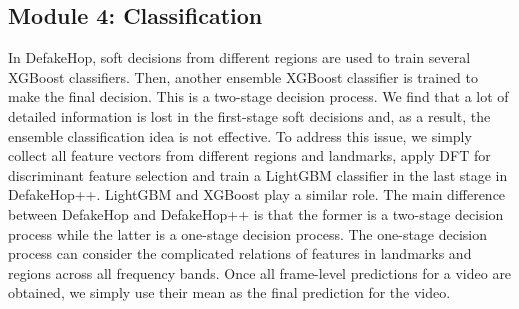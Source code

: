 \documentclass[main, biber]{now-journal}
\begin{document}
\subsection{Module 4: Classification}

In DefakeHop, soft decisions from different regions are used to train
several XGBoost classifiers. Then, another ensemble XGBoost classifier
is trained to make the final decision. This is a two-stage decision
process. We find that a lot of detailed information is lost in the
first-stage soft decisions and, as a result, the ensemble classification
idea is not effective. To address this issue, we simply collect all
feature vectors from different regions and landmarks, apply DFT for
discriminant feature selection and train a LightGBM classifier in the
last stage in DefakeHop++. LightGBM and XGBoost play a similar role. The
main difference between DefakeHop and DefakeHop++ is that the former is
a two-stage decision process while the latter is a one-stage decision
process.  The one-stage decision process can consider the complicated
relations of features in landmarks and regions across all frequency
bands.  Once all frame-level predictions for a video are obtained, we
simply use their mean as the final prediction for the video. 
\end{document}
